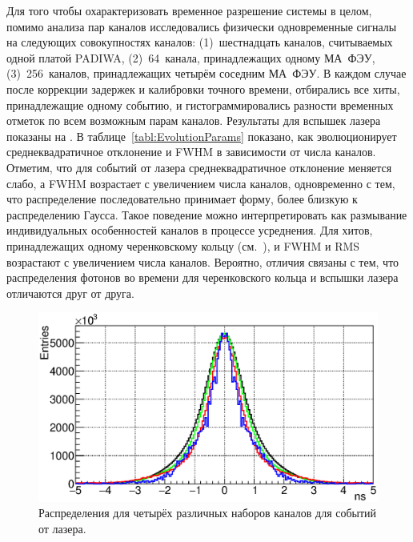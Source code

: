 Для того чтобы охарактеризовать временное разрешение системы в целом, помимо анализа пар каналов исследовались физически одновременные сигналы на следующих совокупностях каналов: (1)~шестнадцать каналов, считываемых одной платой PADIWA, (2)~64~канала, принадлежащих одному МА~ФЭУ, (3)~256~каналов, принадлежащих четырём соседним МА~ФЭУ. В каждом случае после коррекции задержек и калибровки точного времени, отбирались все хиты, принадлежащие одному событию, и гистограммировались разности временных отметок по всем возможным парам каналов. Результаты для вспышек лазера показаны на . В таблице~\ref{tabl:EvolutionParams} показано, как эволюционирует среднеквадратичное отклонение и FWHM в зависимости от числа каналов. Отметим, что для событий от лазера среднеквадратичное отклонение меняется слабо, а FWHM возрастает с увеличением числа каналов, одновременно с тем, что распределение последовательно принимает форму, более близкую к распределению Гаусса. Такое поведение можно интерпретировать как размывание индивидуальных особенностей каналов в процессе усреднения. Для хитов, принадлежащих одному черенковскому кольцу (см.~), и FWHM и RMS возрастают с увеличением числа каналов. Вероятно, отличия связаны с тем, что распределения фотонов во времени для черенковского кольца и вспышки лазера отличаются друг от друга.

\begin{figure}[H]
\includegraphics[width=1.0\textwidth]{pictures/24_TimePrecision_evolution_laser_feb2017.eps}
\caption{Распределения для четырёх различных наборов каналов для событий от лазера.}
\label{fig:TimeResEvolutionLaser}
\end{figure}

